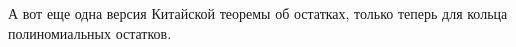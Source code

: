 %
%
%
%
%
%

А вот еще одна версия Китайской теоремы об остатках, только теперь для кольца полиномиальных остатков.

